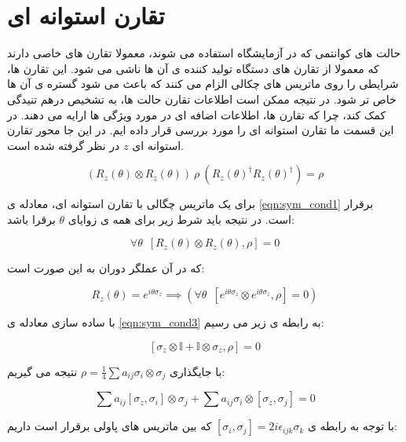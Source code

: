\section{تقارن استوانه ای}

حالت های کوانتمی که در آزمایشگاه استفاده می شوند،‌ معمولا تقارن های خاصی دارند که معمولا از تقارن های دستگاه تولید کننده ی آن ها ناشی می شود.
این تقارن ها، شرایطی را روی ماتریس های چکالی الزام می کنند که باعث می شود گستره ی آن ها خاص تر شود. در نتیجه ممکن است اطلاعات تقارن حالت ها، به تشخیص درهم تنیدگی کمک کند،  چرا که تقارن ها، اطلاعات اضافه ای در مورد ویژگی ها ارایه می دهند.
در این قسمت ما تقارن استوانه ای را مورد بررسی قرار داده ایم. در این جا محور تقارن استوانه ای
$z$
در نظر گرفته شده است.

\begin{equation}\label{eqn:sym_cond1}
(R_z(\theta) \otimes R_z(\theta))\> \rho\> (R_z(\theta)^\dag R_z(\theta)^\dag) = \rho
\end{equation}

برای یک ماتریس چگالی با تقارن استوانه ای، معادله ی
\ref{eqn:sym_cond1}
برقرار است. در نتیجه باید شرط زیر برای همه ی زوایای
$\theta$
برقرا باشد:

\begin{equation}\label{eqn:sym_cond2}
    \forall \theta \enspace [R_z(\theta)\otimes R_z(\theta) , \rho] = 0
\end{equation}

که در آن عملگر دوران به این صورت است:

\begin{equation}\label{eqn:sym_cond3}
R_z(\theta) = e^{i\theta\sigma_z} \implies (\forall \theta \enspace [e^{i\theta\sigma_z}\otimes e^{i\theta\sigma_z} , \rho] = 0)
\end{equation}

با ساده سازی معادله ی
\ref{eqn:sym_cond3}
به رابطه ی زیر می رسیم:

\begin{equation}\label{eqn:sym_cond4}
[\sigma_z\otimes \mathbb{I} + \mathbb{I}\otimes \sigma_z , \rho] = 0
\end{equation}


با جایگذاری
$\rho = \frac{1}{4}\sum a_{ij} \sigma_i \otimes \sigma_j$
نتیجه می گیریم:

\begin{equation}
\sum a_{ij} [\sigma_z,\sigma_i]\otimes \sigma_j + \sum a_{ij} \sigma_i \otimes [\sigma_z,\sigma_j]=0
\end{equation}


با توجه به رابطه ی
$[\sigma_i,\sigma_j] = 2i\epsilon_{ijk} \sigma_k$
که بین ماتریس های پاولی برقرار است  داریم:


